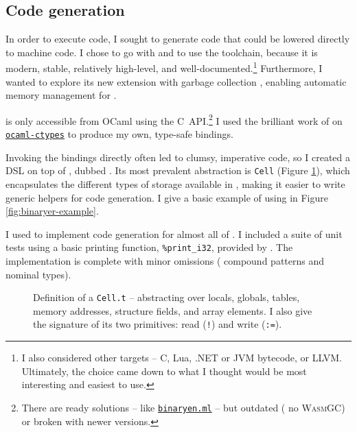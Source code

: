 \subsection{Code generation} 
\label{subsec:codegen}

In order to execute \fabric{} code, I sought to generate code that could be lowered directly to machine code. I chose to go with \wasm{} \cite{wasm} and to use the \binaryen{} \cite{binaryen} toolchain, because it is modern, stable, relatively high-level, and well-documented.\footnote{I also considered other targets -- C, Lua, .NET or JVM bytecode, or LLVM. Ultimately, the choice came down to what I thought would be most interesting and easiest to use.} Furthermore, I wanted to explore its new extension with garbage collection \cite{wasm-gc}, enabling automatic memory management for \fabric{}.

\binaryen{} is only accessible from OCaml using the C~API.\footnote{There are ready solutions -- like \href{https://github.com/grain-lang/binaryen.ml}{\texttt{binaryen.ml}} -- but outdated (\eg{} no \textsc{WasmGC}) or broken with newer \binaryen{} versions.} I used the brilliant work of \textcite{ocaml-ctypes} on \href{https://github.com/yallop/ocaml-ctypes}{\texttt{ocaml-ctypes}} to produce my own, type-safe bindings.

Invoking the bindings directly often led to clumsy, imperative code, so I created a DSL on top of \binaryen{}, dubbed \binaryendsl{}. Its most prevalent abstraction is \texttt{Cell} (Figure \ref{fig:cell-def}), which encapsulates the different types of storage available in \wasm{}, making it easier to write generic helpers for code generation.
I give a basic example of using \binaryendsl{} in Figure \ref{fig:binaryer-example}. 

I used \binaryendsl{} to implement code generation for almost all of \fabric{}. I included a suite of unit tests using a basic printing function, \texttt{\%print\_i32}, provided by \binaryen{}. The implementation is complete with minor omissions (\eg{} compound patterns and nominal types).

\begin{figure}[p]
    \centering
    
    \caption{Definition of a \texttt{Cell.t} -- abstracting over locals, globals, tables, memory addresses, structure fields, and array elements. I also give the signature of its two primitives: read (\texttt{!}) and write (\texttt{:=}). 
    }
    \label{fig:cell-def}
\end{figure}

